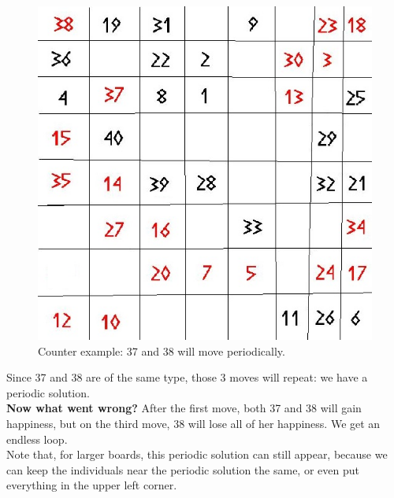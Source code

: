 \begin{figure}[h!]
\begin{center}
\includegraphics[scale=0.25]{Tegenvoorbeeld/segregation_tegenvb_3.jpg}
\end{center}
\caption{Counter example: 37 and 38 will move periodically.}\label{counterexample3}
\end{figure}
Since 37 and 38 are of the same type, those 3 moves will repeat: we have a periodic solution.\\
\textbf{Now what went wrong?} After the first move, both 37 and 38 will gain happiness, but on the third move, 38 will lose all of her happiness. We get an endless loop.\\
Note that, for larger boards, this periodic solution can still appear, because we can keep the individuals near the periodic solution the same, or even put everything in the upper left corner.
%